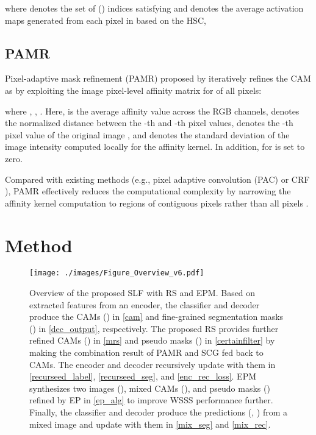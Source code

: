 \documentclass[11pt]{article}
\begin{document}
where  denotes the set of () indices satisfying  and  denotes the average activation maps generated from each pixel in  based on the HSC,
\vspace{0.1cm}
\begin{small}

\end{small} 



\subsection{PAMR}
\label{section:pamr}
Pixel-adaptive mask refinement (PAMR) proposed by \citet{araslanov2020single} iteratively refines the CAM  as  by exploiting the image pixel-level affinity matrix  for  of all pixels: \begin{small}

\end{small} 
where , , . Here,  is the average affinity value  across the RGB channels,  denotes the normalized distance between the -th and -th pixel values,  denotes the -th pixel value of the original image , and  denotes the standard deviation of the image intensity computed locally for the affinity kernel. In addition,  for  is set to zero.

Compared with existing methods (e.g., pixel adaptive convolution (PAC) \cite{su2019pixel} or CRF \cite{krahenbuhl2011efficient}), PAMR effectively reduces the computational complexity by narrowing the affinity kernel computation  to regions of contiguous pixels  rather than all pixels . 


\section{Method}

\begin{figure*}[t]\centering \texttt{[image: ./images/Figure\_Overview\_v6.pdf]}
\caption{ 
Overview of the proposed SLF with RS and EPM. {Based on extracted features from an encoder, the classifier and decoder produce the CAMs () in \eqref{cam} and fine-grained segmentation masks () in \eqref{dec_output}, respectively. The proposed RS provides further refined CAMs () in \eqref{mrs} and pseudo masks () in \eqref{certainfilter} by making the combination result of PAMR and SCG fed back to CAMs. The encoder and decoder recursively update with them in  \eqref{recurseed_label},  \eqref{recurseed_seg}, and  \eqref{enc_rec_loss}. EPM synthesizes two images (), mixed CAMs (), and pseudo masks () refined by EP in \eqref{ep_alg} to improve WSSS performance further. Finally, the classifier and decoder produce the predictions (, ) from a mixed image and update with them in  \eqref{mix_seg} and  \eqref{mix_rec}.}
    }
    \label{fig:overview}


\end{figure*}
\end{document}
